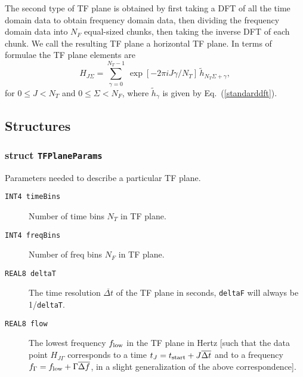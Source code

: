 The second type of TF plane is obtained by first taking a DFT of all the time
domain data to obtain frequency domain data, then dividing the frequency
domain data into $N_F$ equal-sized chunks, then taking the inverse DFT of each
chunk.  We call the resulting TF plane a horizontal TF plane. In terms of
formulae the TF plane elements are \begin{equation} H_{J\Sigma} =
\sum_{\gamma=0}^{N_T-1} \, \exp \left[ -2 \pi i J \gamma / N_T \right] \,
{\tilde h}_{N_T \Sigma + \gamma}, \label{horizontalTFP} \end{equation} for $0
\le J < N_T$ and $0 \le \Sigma < N_F$, where ${\tilde h}_\gamma$ is given by
Eq.\ (\ref{standarddft}).


\subsection*{Structures}

\subsubsection*{struct \texttt{TFPlaneParams}}

\noindent Parameters needed to describe a particular TF plane.

\begin{description}
\item[\texttt{INT4 timeBins}] Number of time bins $N_T$ in TF plane.

\item[\texttt{INT4 freqBins}] Number of freq bins $N_F$ in TF plane.

\item[\texttt{REAL8 deltaT}] The time resolution ${\overline {\Delta t}}$
of the TF plane in seconds, \texttt{deltaF} will always be 1/\texttt{deltaT}.

\item[\texttt{REAL8 flow}] The lowest frequency $f_{\rm low}$ in the TF plane
in Hertz [such that the data point $H_{J\Gamma}$ corresponds to a time $t_J =
t_{\rm start} + J {\overline {\Delta t}}$ and to a frequency $f_\Gamma =
f_{\rm low} + \Gamma {\overline {\Delta f}}$, in a slight generalization of
the above correspondence].
\end{description}

